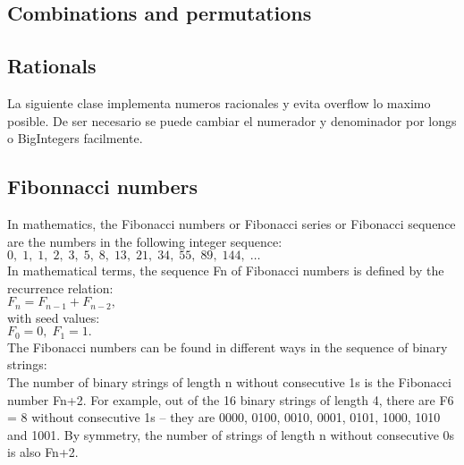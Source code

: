 \documentclass[10pt,letterpaper,twocolumn,twosided]{article}
\newcommand{\codigofuente}[1]{

\dotfill
}
\begin{document}
\codigofuente{src/misc/subconjuntos.cpp}

\subsection{Combinations and permutations}

\codigofuente{src/misc/combiperm.cpp}

\subsection{Rationals}

La siguiente clase implementa numeros racionales y evita overflow lo maximo posible. De ser necesario se puede cambiar el numerador y denominador por longs o BigIntegers facilmente.

\codigofuente{src/misc/rationals.cpp}

\subsection{Fibonnacci numbers}

In mathematics, the Fibonacci numbers or Fibonacci series or Fibonacci sequence are the numbers in the following integer sequence:\\

$0,\;1,\;1,\;2,\;3,\;5,\;8,\;13,\;21,\;34,\;55,\;89,\;144,\; \ldots\;$\\

In mathematical terms, the sequence Fn of Fibonacci numbers is defined by the recurrence relation:\\

$F_n = F_{n-1} + F_{n-2},\!\,$\\

with seed values:\\

$F_0 = 0,\; F_1 = 1.$\\

The Fibonacci numbers can be found in different ways in the sequence of binary strings:\\

The number of binary strings of length n without consecutive 1s is the Fibonacci number Fn+2. For example, out of the 16 binary strings of length 4, there are F6 = 8 without consecutive 1s – they are 0000, 0100, 0010, 0001, 0101, 1000, 1010 and 1001. By symmetry, the number of strings of length n without consecutive 0s is also Fn+2.\\
\end{document}
